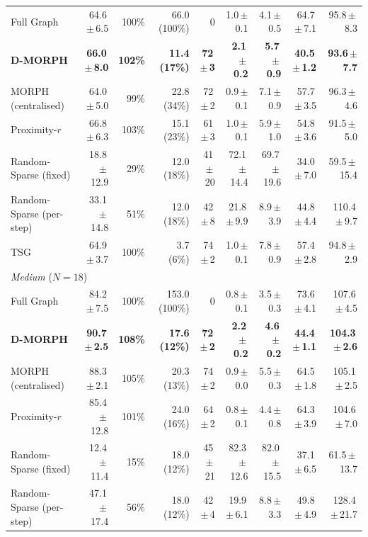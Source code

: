 \begin{table}[!ht]
\begin{tabular}{lrrrrrrrr}
Full Graph & 64.6\,$\pm$\,6.5 & 100\% & 66.0 (100\%) & 0 & 1.0\,$\pm$\,0.1 & 4.1\,$\pm$\,0.5 & 64.7\,$\pm$\,7.1 & 95.8\,$\pm$\,8.3 \\
\textbf{D-MORPH} & \textbf{66.0\,$\pm$\,8.0} & \textbf{102\%} & \textbf{11.4 (17\%)} & \textbf{72\,$\pm$\,3} & \textbf{2.1\,$\pm$\,0.2} & \textbf{5.7\,$\pm$\,0.9} & \textbf{40.5\,$\pm$\,1.2} & \textbf{93.6\,$\pm$\,7.7} \\
MORPH (centralised) & 64.0\,$\pm$\,5.0 & 99\% & 22.8 (34\%) & 72\,$\pm$\,2 & 0.9\,$\pm$\,0.1 & 7.1\,$\pm$\,0.9 & 57.7\,$\pm$\,3.5 & 96.3\,$\pm$\,4.6 \\
Proximity-$r$ & 66.8\,$\pm$\,6.3 & 103\% & 15.1 (23\%) & 61\,$\pm$\,3 & 1.0\,$\pm$\,0.1 & 5.9\,$\pm$\,1.0 & 54.8\,$\pm$\,3.6 & 91.5\,$\pm$\,5.0 \\
Random-Sparse (fixed) & 18.8\,$\pm$\,12.9 & 29\% & 12.0 (18\%) & 41\,$\pm$\,20 & 72.1\,$\pm$\,14.4 & 69.7\,$\pm$\,19.6 & 34.0\,$\pm$\,7.0 & 59.5\,$\pm$\,15.4 \\
Random-Sparse (per-step) & 33.1\,$\pm$\,14.8 & 51\% & 12.0 (18\%) & 42\,$\pm$\,8 & 21.8\,$\pm$\,9.9 & 8.9\,$\pm$\,3.9 & 44.8\,$\pm$\,4.4 & 110.4\,$\pm$\,9.7 \\
TSG & 64.9\,$\pm$\,3.7 & 100\% & 3.7 (6\%) & 74\,$\pm$\,2 & 1.0\,$\pm$\,0.1 & 7.8\,$\pm$\,0.9 & 57.4\,$\pm$\,2.8 & 94.8\,$\pm$\,2.9 \\
\hline
\multicolumn{9}{l}{\textit{Medium} ($N=18$)} \\
Full Graph & 84.2\,$\pm$\,7.5 & 100\% & 153.0 (100\%) & 0 & 0.8\,$\pm$\,0.1 & 3.5\,$\pm$\,0.3 & 73.6\,$\pm$\,4.1 & 107.6\,$\pm$\,4.5 \\
\textbf{D-MORPH} & \textbf{90.7\,$\pm$\,2.5} & \textbf{108\%} & \textbf{17.6 (12\%)} & \textbf{72\,$\pm$\,2} & \textbf{2.2\,$\pm$\,0.2} & \textbf{4.6\,$\pm$\,0.2} & \textbf{44.4\,$\pm$\,1.1} & \textbf{104.3\,$\pm$\,2.6} \\
MORPH (centralised) & 88.3\,$\pm$\,2.1 & 105\% & 20.3 (13\%) & 74\,$\pm$\,2 & 0.9\,$\pm$\,0.0 & 5.5\,$\pm$\,0.3 & 64.5\,$\pm$\,1.8 & 105.1\,$\pm$\,2.5 \\
Proximity-$r$ & 85.4\,$\pm$\,12.8 & 101\% & 24.0 (16\%) & 64\,$\pm$\,2 & 0.8\,$\pm$\,0.1 & 4.4\,$\pm$\,0.8 & 64.3\,$\pm$\,3.9 & 104.6\,$\pm$\,7.0 \\
Random-Sparse (fixed) & 12.4\,$\pm$\,11.4 & 15\% & 18.0 (12\%) & 45\,$\pm$\,21 & 82.3\,$\pm$\,12.6 & 82.0\,$\pm$\,15.5 & 37.1\,$\pm$\,6.5 & 61.5\,$\pm$\,13.7 \\
Random-Sparse (per-step) & 47.1\,$\pm$\,17.4 & 56\% & 18.0 (12\%) & 42\,$\pm$\,4 & 19.9\,$\pm$\,6.1 & 8.8\,$\pm$\,3.3 & 49.8\,$\pm$\,4.9 & 128.4\,$\pm$\,21.7 \\

\end{tabular}
\end{table}
